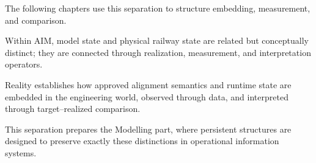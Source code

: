 \noindent
The following chapters use this separation to structure embedding,
measurement, and comparison.

\begin{principle}
\label{princ:reality-principle}
Within AIM, model state and physical railway state are related but
conceptually distinct; they are connected through realization,
measurement, and interpretation operators.
\end{principle}

\begin{summary}
Reality establishes how approved alignment semantics and runtime state
are embedded in the engineering world, observed through data, and
interpreted through target--realized comparison.
\end{summary}

This separation prepares the Modelling part, where persistent structures
are designed to preserve exactly these distinctions in operational
information systems.
